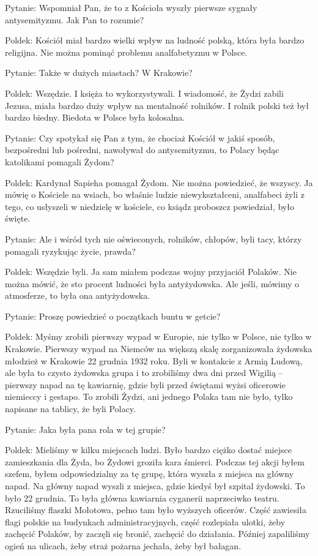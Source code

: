 Pytanie: Wspomniał Pan, że to z Kościoła wyszły pierwsze sygnały antysemityzmu. Jak Pan to rozumie? 

Poldek: Kościół miał bardzo wielki wpływ na ludność polską, która była bardzo religijna. Nie można pominąć problemu analfabetyzmu w Polsce. 

Pytanie: Także w dużych miastach? W Krakowie? 

Poldek: Wszędzie. I księża to wykorzystywali. I wiadomość, że Żydzi zabili Jezusa, miała bardzo duży wpływ na mentalność rolników. I rolnik polski też był bardzo biedny. Biedota w Polsce była kolosalna.  

Pytanie: Czy spotykał się Pan z tym, że chociaż Kościół w jakiś sposób, bezpośredni lub pośredni, nawoływał do antysemityzmu, to Polacy będąc katolikami pomagali Żydom? 

Poldek: Kardynał Sapieha pomagał Żydom. Nie można powiedzieć, że wszyscy. Ja mówię o Kościele na wsiach, bo właśnie ludzie niewykształceni, analfabeci żyli z tego, co usłyszeli w niedzielę w kościele, co ksiądz proboszcz powiedział, było święte.  

Pytanie: Ale i wśród tych nie oświeconych, rolników, chłopów, byli tacy, którzy pomagali ryzykując życie, prawda? 

Poldek: Wszędzie byli. Ja sam miałem podczas wojny przyjaciół Polaków. Nie można mówić, że sto procent ludności była antyżydowska. Ale jeśli, mówimy o atmosferze, to była ona antyżydowska. 

Pytanie: Proszę powiedzieć o początkach buntu w getcie?  

Poldek: Myśmy zrobili pierwszy wypad w Europie, nie tylko w Polsce, nie tylko w Krakowie. Pierwszy wypad na Niemców na większą skalę zorganizowała żydowska młodzież w Krakowie 22 grudnia 1932 roku. Byli w kontakcie z Armią Ludową, ale była to czysto żydowska grupa i to zrobiliśmy dwa dni przed Wigilią – pierwszy napad na tę kawiarnię, gdzie byli przed świętami wyżsi oficerowie niemieccy i gestapo. To zrobili Żydzi, ani jednego Polaka tam nie było, tylko napisane na tablicy, że byli Polacy.  

Pytanie: Jaka była pana rola w tej grupie? 

Poldek: Mieliśmy w kilku miejscach ludzi. Było bardzo ciężko dostać miejsce zamieszkania dla Żyda, bo Żydowi groziła kara śmierci. Podczas tej akcji byłem szefem, byłem odpowiedzialny za tę grupę, która wyszła z miejsca na główny napad. Na główny napad wyszli z miejsca, gdzie kiedyś był szpital żydowski. To było 22 grudnia. To była główna kawiarnia cyganerii naprzeciwko teatru. Rzuciliśmy flaszki Mołotowa, pełno tam było wyższych oficerów. Część zawiesiła flagi polskie na budynkach administracyjnych, część rozlepiała ulotki, żeby zachęcić Polaków, by zaczęli się bronić, zachęcić do działania. Później zapaliliśmy ogień na ulicach, żeby straż pożarna jechała, żeby był bałagan.  

